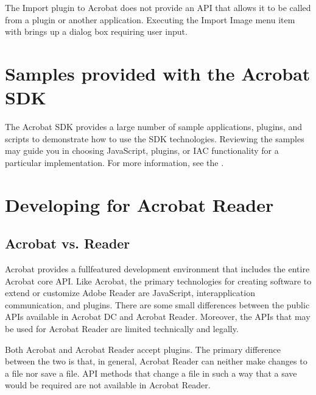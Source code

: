 \documentclass[letterpaper,12pt,english,openany,oneside]{sphinxmanual}
\begin{document}
The Import plug\sphinxhyphen{}in to Acrobat does not provide an API that allows it to be called from a plug\sphinxhyphen{}in or another application. Executing the Import Image menu item with  brings up a dialog box requiring user input.




\section{Samples provided with the Acrobat SDK}
\label{\detokenize{index:samples-provided-with-the-acrobat-sdk}}
The Acrobat SDK provides a large number of sample applications, plug\sphinxhyphen{}ins, and scripts to demonstrate how to use the SDK technologies. Reviewing the samples may guide you in choosing JavaScript, plug\sphinxhyphen{}ins, or IAC functionality for a particular implementation. For more information, see the  .




\section{Developing for Acrobat Reader}
\label{\detokenize{index:developing-for-acrobat-reader}}

\subsection{Acrobat vs. Reader}
\label{\detokenize{index:acrobat-vs-reader}}
Acrobat provides a full\sphinxhyphen{}featured development environment that includes the entire Acrobat core API. Like Acrobat, the primary technologies for creating software to extend or customize Adobe Reader are JavaScript, interapplication communication, and plug\sphinxhyphen{}ins. There are some small differences between the public APIs available in Acrobat DC and Acrobat Reader. Moreover, the APIs that may be used for Acrobat Reader are limited technically and legally.

Both Acrobat and Acrobat Reader accept plug\sphinxhyphen{}ins. The primary difference between the two is that, in general, Acrobat Reader can neither make changes to a file nor save a file. API methods that change a file in such a way that a save would be required are not available in Acrobat Reader.
\end{document}
